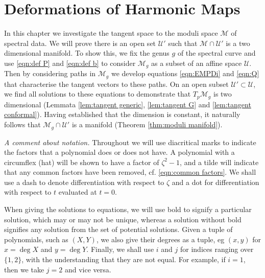 
\chapter{Deformations of Harmonic Maps}
\label{chp:Deformation}

In this chapter we investigate the tangent space to the moduli space $\mathcal{M}$ of spectral data. We will prove there is an open set $\mathcal{U}'$ such that $\mathcal{M}\cap \mathcal{U}'$ is a two dimensional manifold. To show this, we fix the genus $g$ of the spectral curve and use \eqref{eqn:def P} and \eqref{eqn:def b} to consider $\mathcal{M}_g$ as a subset of an affine space $\mathcal{U}$. Then by considering paths in $\mathcal{M}_g$ we develop equations \eqref{eqn:EMPDi} and \eqref{eqn:Q} that characterise the tangent vectors to these paths. On an open subset $\mathcal{U}' \subset \mathcal{U}$, we find all solutions to these equations to demonstrate that $T_p\mathcal{M}_g$ is two dimensional (Lemmata \ref{lem:tangent generic}, \ref{lem:tangent G} and \ref{lem:tangent conformal}). Having established that the dimension is constant, it naturally follows that $\mathcal{M}_g\cap \mathcal{U}'$ is a manifold (Theorem \ref{thm:moduli manifold}).

\emph{A comment about notation.} Throughout we will use diacritical marks to indicate the factors that a polynomial does or does not have. A polynomial with a circumflex (hat) will be shown to have a factor of $ζ^2-1$, and a tilde will indicate that any common factors have been removed, cf. \eqref{eqn:common factors}. We shall use a dash to denote differentiation with respect to $ζ$ and a dot for differentiation with respect to $t$ evaluated at $t=0$.

When giving the solutions to equations, we will use bold to signify a particular solution, which may or may not be unique, whereas a solution without bold signifies any solution from the set of potential solutions. Given a tuple of polynomials, such as $(X,Y)$, we also give their degrees as a tuple, eg $(x,y)$ for $x=\deg X$ and $y=\deg Y$. Finally, we shall use $i$ and $j$ for indices ranging over $\{1,2\}$, with the understanding that they are not equal. For example, if $i=1$, then we take $j=2$ and vice versa.

